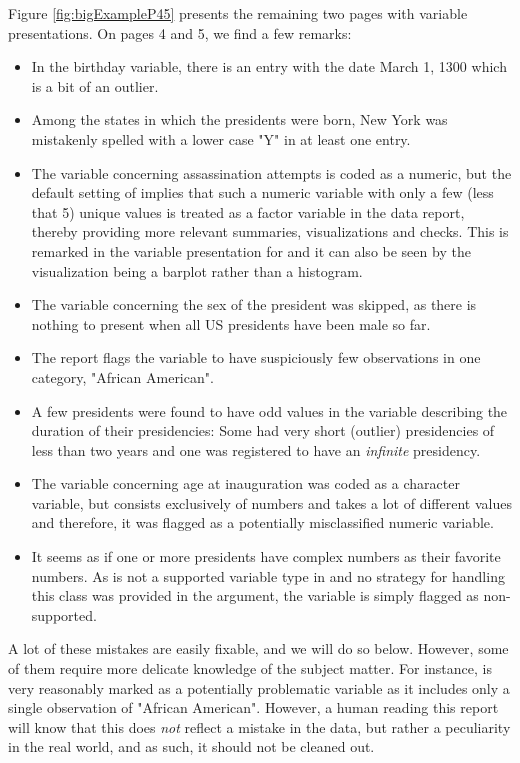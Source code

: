 \documentclass[article,shortnames]{jss}
\begin{document}
Figure \ref{fig:bigExampleP45} presents the remaining two pages with variable presentations. On pages 4 and 5, we find a few remarks:
\begin{itemize}
\item In the birthday variable, there is an entry with the date March 1, 1300 which is a bit of an outlier. 
\item Among the states in which the presidents were born, New York was mistakenly spelled with a lower case "Y" in at least one entry.
\item The variable concerning assassination attempts is coded as a numeric, but the default  setting of  implies that such a numeric variable with only a few (less that 5) unique values is treated as a factor variable in the data report, thereby providing more relevant summaries, visualizations and checks. This is remarked in the variable presentation for  and it can also be seen by the visualization being a barplot rather than a histogram.
\item The variable concerning the sex of the president was skipped, as there is nothing to present when all US presidents have been male so far.
\item The report flags the variable  to have suspiciously few observations in one category, "African American". 
\item A few presidents were found to have odd values in the variable describing the duration of their presidencies: Some had very short (outlier) presidencies of less than two years and one was registered to have an \textit{infinite} presidency. 
\item The variable concerning age at inauguration was coded as a character variable, but consists exclusively of numbers and takes a lot of different values and therefore, it was flagged as a potentially misclassified numeric variable.
\item It seems as if one or more presidents have complex numbers as their favorite numbers. As  is not a supported variable type in  and no strategy for handling this class was provided in the  argument, the variable is simply flagged as non-supported.
\end{itemize}
A lot of these mistakes are easily fixable, and we will do so below. However, some of them require more delicate knowledge of the subject matter. For instance,  is very reasonably marked as a potentially problematic variable as it includes only a single observation of "African American". However, a human reading this report will know that this does \textit{not} reflect a mistake in the data, but rather a peculiarity in the real world, and as such, it should not be cleaned out. 
\end{document}
